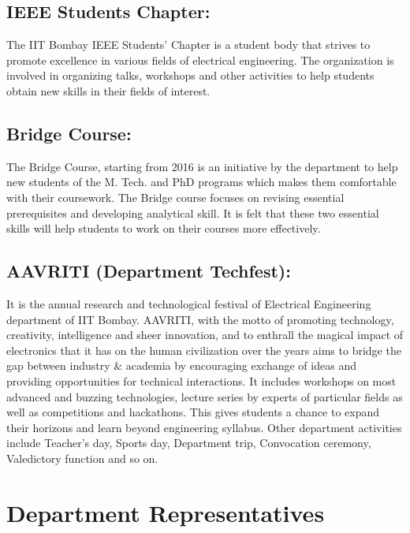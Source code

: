 \documentclass[openany]{book} %
\begin{document}
\section {IEEE Students Chapter:}
The IIT Bombay IEEE Students’ Chapter is a student body that strives to promote excellence in various fields of electrical engineering. The organization is involved in organizing talks, workshops and other activities to help students obtain new skills in their fields of interest.\newline
\section {Bridge Course:}
The Bridge Course, starting from 2016 is an initiative by the department to help new students of the M. Tech. and PhD programs which makes them comfortable with their coursework. The Bridge course focuses on revising essential prerequisites and developing analytical skill. It is felt that these two essential skills will help students to work on their courses more effectively.\newline
\section {AAVRITI (Department Techfest):}
It is the annual research and technological festival of Electrical Engineering department of IIT Bombay. AAVRITI, with the motto of promoting technology, creativity, intelligence and sheer innovation, and to enthrall the magical impact of electronics that it has on the human civilization over the years aims to bridge the gap between industry \& academia by encouraging exchange of ideas and providing opportunities for technical interactions.\newline
It includes workshops on most advanced and buzzing technologies, lecture series by experts of particular fields as well as competitions and hackathons. This gives students a chance to expand their horizons and learn beyond engineering syllabus.\newline
Other department activities include Teacher’s day, Sports day, Department trip, Convocation ceremony, Valedictory function and so on.

\chapter{Department Representatives}
\end{document}

